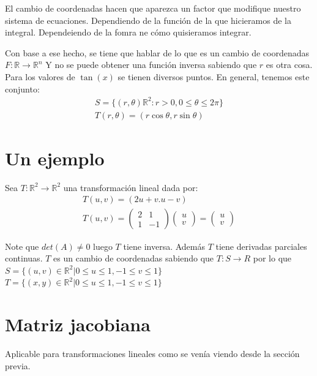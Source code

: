 \documentclass{article}
\newcommand{\field}[1]{\mathbb{#1}}
\newcommand{\R}{\field{R}}
\begin{document}
El cambio de coordenadas hacen que aparezca un factor que modifique nuestro
sistema de ecuaciones. Dependiendo de la función de la que hicieramos de la
integral. Dependeiendo de la fomra ne cómo quisieramos integrar.

Con base a ese hecho, se tiene que hablar de lo que es un cambio de coordenadas
$  F: \R \longrightarrow \R^{n} $ Y no se puede obtener una función inversa
sabiendo que $ r $ es otra cosa. Para los valores de $\tan(x)$ se tienen
diversos puntos. En general, tenemos este conjunto:
\begin{align}
	S = \{(r, \theta)\R^2: r>0, 0 \leq \theta \leq 2 \pi\} \\
	T(r, \theta) = (r\cos{\theta}, r\sin{\theta})
\end{align}

\section*{Un ejemplo}

Sea $ T: \R^2 \longrightarrow \R^2 $ una transformación lineal dada por:
\begin{align}
	T(u, v) = (2u+v. u-v) \\
	T(u, v) = \left( \begin{matrix}
		                 2 & 1  \\
		                 1 & -1
	                 \end{matrix} \right)
	\left( \begin{matrix}
		       u \\
		       v
	       \end{matrix} \right) = \left( \begin{matrix}
		                                     u \\
		                                     v
	                                     \end{matrix} \right)
\end{align}

Note que $ det(A)\neq0$ luego $T$ tiene inversa. Además $T$ tiene derivadas
parciales continuas. $T$ es un cambio de coordenadas sabiendo que
$ T:S \longrightarrow R $ por lo que
$ S = \{(u, v) \in \R^2 | 0 \leq u \leq 1, -1 \leq v \leq 1\}$
$ T = \{(x, y) \in \R^2 | 0 \leq u \leq 1, -1 \leq v \leq 1\}$

\section*{Matriz jacobiana}
Aplicable para transformaciones lineales como se venía viendo desde la sección
previa.
\end{document}
